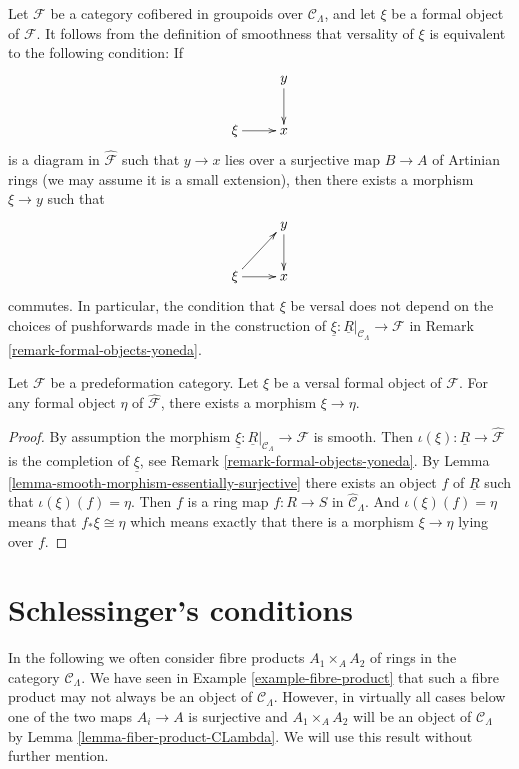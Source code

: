 \begin{remark}
\label{remark-versal-object}
Let $\mathcal{F}$ be a category cofibered in groupoids over $\mathcal
C_\Lambda$, and let $\xi$ be a formal object of $\mathcal{F}$.  It follows
from the definition of smoothness that versality of $\xi$ is equivalent to the
following condition: If
$$
\xymatrix{
& y \ar[d] \\
\xi \ar[r] & x
}
$$
is a diagram in $\widehat{\mathcal{F}}$ such that $y \to x$ lies over a
surjective map $B \to A$ of Artinian rings (we may assume it is a small
extension),  then there exists a morphism $\xi \to y$ such that
$$
\xymatrix{
& y \ar[d] \\
\xi \ar[r] \ar[ur] & x
}
$$
commutes. In particular, the condition that $\xi$ be versal does not depend on
the choices of pushforwards made in the construction of
$\underline{\xi} : \underline{R}|_{\mathcal{C}_\Lambda} \to \mathcal{F}$ in
Remark \ref{remark-formal-objects-yoneda}.
\end{remark}

\begin{lemma}
\label{lemma-versal-object-quasi-initial}
Let $\mathcal{F}$ be a predeformation category.
Let $\xi$ be a versal formal object of $\mathcal{F}$.
For any formal object $\eta$ of $\widehat{\mathcal{F}}$,
there exists a morphism $\xi \to \eta$.
\end{lemma}

\begin{proof}
By assumption the morphism
$\underline{\xi} : \underline{R}|_{\mathcal{C}_\Lambda} \to \mathcal{F}$
is smooth. Then
$\iota(\xi) : \underline{R} \to \widehat{\mathcal{F}}$
is the completion of $\underline{\xi}$, see
Remark \ref{remark-formal-objects-yoneda}.
By
Lemma \ref{lemma-smooth-morphism-essentially-surjective}
there exists an object $f$ of $\underline{R}$ such that
$\iota(\xi)(f) = \eta$. Then $f$ is
a ring map $f : R \to S$ in $\widehat{\mathcal{C}}_\Lambda$. And
$\iota(\xi)(f) = \eta$ means that
$f_*\xi \cong \eta$ which means exactly that there is a morphism
$\xi \to \eta$ lying over $f$.
\end{proof}






\section{Schlessinger's conditions}
\label{section-schlessinger-conditions}

\noindent
In the following we often consider fibre products $A_1 \times_A A_2$
of rings in the category $\mathcal{C}_\Lambda$. We have seen in
Example \ref{example-fibre-product}
that such a fibre product may not always be an object of
$\mathcal{C}_\Lambda$. However, in virtually all cases below one of the
two maps $A_i \to A$ is surjective and $A_1 \times_A A_2$ will be
an object of $\mathcal{C}_\Lambda$ by
Lemma \ref{lemma-fiber-product-CLambda}.
We will use this result without further mention.

